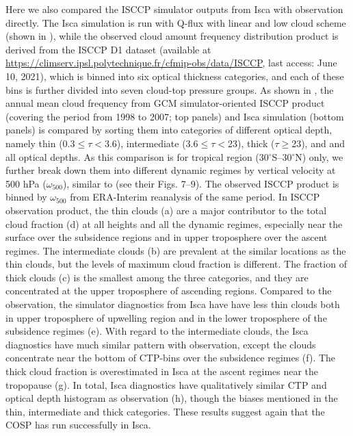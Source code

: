Here we also compared the ISCCP simulator outputs from Isca with observation directly. The Isca simulation is run with Q-flux with linear and low cloud scheme (shown in ), while the observed cloud amount frequency distribution product is derived from the ISCCP D1 dataset \citep{Rossow1999advances} (available at \url{https://climserv.ipsl.polytechnique.fr/cfmip-obs/data/ISCCP}, last access: June 10, 2021), which is binned into six optical thickness categories, and each of these bins is further divided into seven cloud-top pressure groups. As shown in , 
the annual mean cloud frequency from  GCM simulator-oriented ISCCP product (covering the period from 1998 to 2007; top panels) and Isca simulation (bottom panels) is compared by sorting them into categories of different optical depth, namely thin (0.3$\le\tau<$3.6), intermediate (3.6$\le\tau<$23), thick ($\tau\ge$23), and and all optical depths. As this comparison is for tropical region (30$^\circ$S--30$^\circ$N) only, we further break down them into different dynamic regimes by vertical velocity at 500 hPa ($\omega_{500}$), similar to \cite{Wyant2006comparison} (see their Figs. 7--9). The observed ISCCP product is binned by $\omega_{500}$ from ERA-Interim reanalysis of the same period. In ISCCP observation product, the thin clouds (a) are a major contributor to the total cloud fraction (d) at all heights and all the dynamic regimes, especially near the surface over the subsidence regions and in upper troposphere over the ascent regimes. The intermediate clouds (b) are prevalent at the similar locations as the thin clouds, but the levels of maximum cloud fraction is different. The fraction of thick clouds (c) is the smallest among the three categories, and they are concentrated at the upper troposphere of ascending regions. Compared to the observation, the simulator diagnostics from Isca have have less thin clouds both in upper troposphere of upwelling region and in the lower troposphere of the subsidence regimes (e). With regard to the intermediate clouds, the Isca diagnostics have much similar pattern with observation, except the clouds concentrate near the bottom of CTP-bins over the subsidence regimes (f). The thick cloud fraction is overestimated in Isca at the ascent regimes near the tropopause (g). In total, Isca diagnostics have qualitatively similar CTP and optical depth histogram as observation (h), though the biases mentioned in the thin, intermediate and thick categories. These results suggest again that the COSP has run successfully in Isca.



